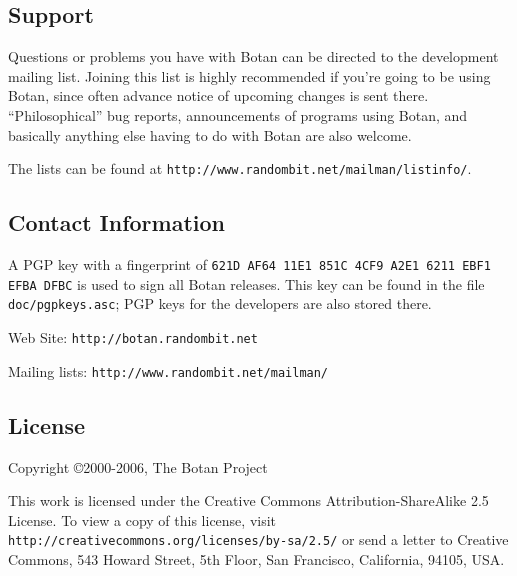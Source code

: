 \documentclass{article}
\newcommand{\filename}[1]{\texttt{#1}}
\newcommand{\url}[1]{\texttt{#1}}
\begin{document}
\subsection{Support}

Questions or problems you have with Botan can be directed to the
development mailing list. Joining this list is highly recommended if
you're going to be using Botan, since often advance notice of upcoming
changes is sent there. ``Philosophical'' bug reports, announcements of
programs using Botan, and basically anything else having to do with
Botan are also welcome.

The lists can be found at
\url{http://www.randombit.net/mailman/listinfo/}.

\subsection{Contact Information}

A PGP key with a fingerprint of
\verb|621D AF64 11E1 851C 4CF9 A2E1 6211 EBF1 EFBA DFBC| is used to sign all
Botan releases. This key can be found in the file \filename{doc/pgpkeys.asc};
PGP keys for the developers are also stored there.

\vskip 5pt \noindent
Web Site: \url{http://botan.randombit.net}

\vskip 5pt \noindent
Mailing lists: \url{http://www.randombit.net/mailman/}

\subsection{License}

Copyright \copyright  2000-2006, The Botan Project

This work is licensed under the Creative Commons
Attribution-ShareAlike 2.5 License. To view a copy of this license,
visit \url{http://creativecommons.org/licenses/by-sa/2.5/} or send a
letter to Creative Commons, 543 Howard Street, 5th Floor, San
Francisco, California, 94105, USA.
\end{document}
